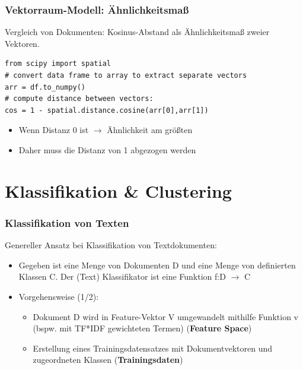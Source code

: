 \begin{frame}[fragile]
    \frametitle{Vektorraum-Modell: Ähnlichkeitsmaß}
    Vergleich von Dokumenten: Kosinus-Abstand als Ähnlichkeitsmaß zweier Vektoren.

    \begin{verbatim}
from scipy import spatial
# convert data frame to array to extract separate vectors
arr = df.to_numpy()
# compute distance between vectors:
cos = 1 - spatial.distance.cosine(arr[0],arr[1])
    \end{verbatim}

    \begin{itemize}
    \item Wenn  Distanz 0 ist $\rightarrow$ Ähnlichkeit am größten 
    \item Daher muss die Distanz von 1 abgezogen werden
    \end{itemize}
\end{frame}
 

\section{Klassifikation \& Clustering}


\begin{frame}
    \frametitle{Klassifikation von Texten}

    Genereller Ansatz bei Klassifikation von Textdokumenten:
    \begin{itemize}
    \item Gegeben ist eine Menge von Dokumenten D und eine Menge von definierten Klassen C. Der (Text) Klassifikator ist eine Funktion f:D $\rightarrow$ C
    \item Vorgehensweise (1/2):
    \begin{itemize}
    \item Dokument D wird in Feature-Vektor V umgewandelt mithilfe Funktion v (bspw. mit TF*IDF gewichteten Termen) (\textbf{Feature Space})
    \item Erstellung eines Trainingsdatensatzes mit Dokumentvektoren und zugeordneten Klassen (\textbf{Trainingsdaten})
    \end{itemize}
    \end{itemize}
\end{frame}
    


